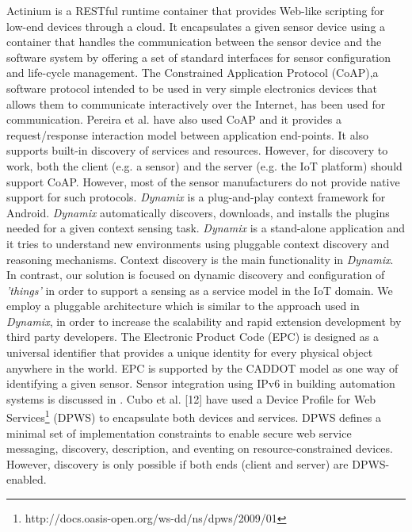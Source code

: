 \documentclass[graybox]{svmult}
\newcommand{\things}{\textit{'things' }}
\begin{document}
Actinium \cite{P636} is a RESTful runtime container that provides Web-like scripting for low-end devices through a cloud. It encapsulates a given sensor device using a container that handles the communication between the sensor device and the software system by offering a set of standard interfaces for sensor configuration and life-cycle management. The Constrained Application Protocol (CoAP),a software protocol intended to be used in very simple electronics devices that allows them to communicate interactively over the Internet, has been used for communication. Pereira et al. \cite{P641} have also used CoAP and it provides a request/response interaction model between application end-points. It also supports built-in discovery of services and resources. However, for discovery to work, both the client (e.g. a sensor) and the server (e.g. the IoT platform) should support CoAP. However, most of the sensor manufacturers do not provide native support for such protocols. \textit{Dynamix} \cite{P627} is a plug-and-play context framework for Android. \textit{Dynamix} automatically discovers, downloads, and installs the plugins needed for a given context sensing task. \textit{Dynamix} is a stand-alone application and it tries to understand new environments using pluggable context discovery and reasoning mechanisms. Context discovery is the main functionality in \textit{Dynamix}. In contrast, our solution is focused on dynamic discovery and configuration of \things in order to support a sensing as a service model in the IoT domain. We employ a pluggable architecture which is similar to the approach used in \textit{Dynamix}, in order to increase the scalability  and rapid extension development by third party developers. The Electronic Product Code (EPC)  \cite{P110} is designed as a universal identifier that provides a unique identity for every physical object anywhere in the world. EPC is supported by the CADDOT model as one way of identifying a given sensor. Sensor integration using IPv6 in building automation systems is discussed in \cite{P656}. Cubo et al. [12] have used a Device Profile for Web Services\footnote{http://docs.oasis-open.org/ws-dd/ns/dpws/2009/01} (DPWS) to encapsulate both devices and services. DPWS defines a minimal set of implementation constraints to enable secure web service messaging, discovery, description, and eventing on resource-constrained devices. However, discovery is only possible if both ends (client and server) are DPWS-enabled.
\end{document}
